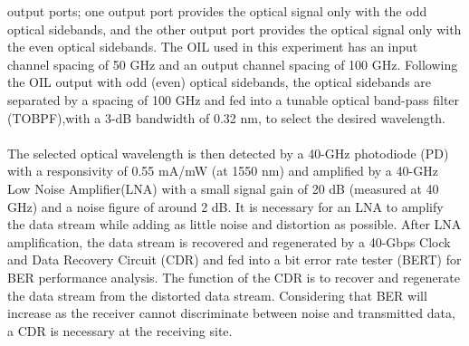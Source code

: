 \documentclass[hidelinks, 12pt]{report}
\begin{document}
output ports; one output port provides the optical signal only with the odd optical sidebands, and
the other output port provides the optical signal only with the even optical sidebands. The OIL
used in this experiment has an input channel spacing of 50 GHz and an output channel spacing
of 100 GHz. Following the OIL output with odd (even) optical sidebands, the optical sidebands
are separated by a spacing of 100 GHz and fed into a tunable optical band-pass filter (TOBPF),with a 3-dB bandwidth of 0.32 nm, to select the desired wavelength. \\
\\The selected optical wavelength
is then detected by a 40-GHz photodiode (PD) with a responsivity of 0.55 mA/mW (at
1550 nm) and amplified by a 40-GHz Low Noise Amplifier(LNA) with a small signal gain of 20 dB (measured at
40 GHz) and a noise figure of around 2 dB. It is necessary for an LNA to amplify the data stream
while adding as little noise and distortion as possible. After LNA amplification, the data stream is
recovered and regenerated by a 40-Gbps Clock and Data Recovery Circuit (CDR) and fed into a bit error rate tester (BERT) for
BER performance analysis. The function of the CDR is to recover and regenerate the data
stream from the distorted data stream. Considering that BER will increase as the receiver cannot
discriminate between noise and transmitted data, a CDR is necessary at the receiving site.
\end{document}
